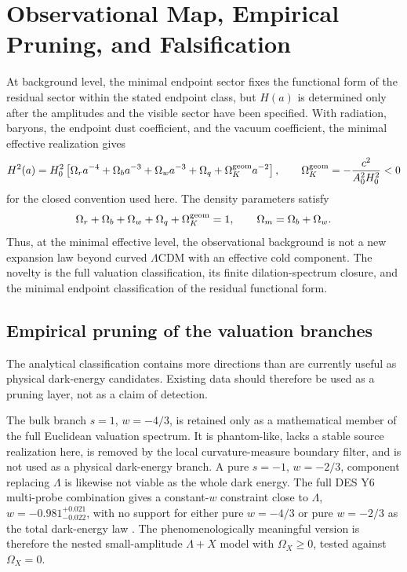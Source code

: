 \documentclass[11pt,a4paper]{article}
\numberwithin{equation}{section}
\theoremstyle{definition}
\theoremstyle{plain}
\theoremstyle{remark}
\begin{document}
\section{Observational Map, Empirical Pruning, and Falsification}
At background level, the minimal endpoint sector fixes the functional form of the residual sector within the stated endpoint class, but \(H(a)\) is determined only after the amplitudes and the visible sector have been specified. With radiation, baryons, the endpoint dust coefficient, and the vacuum coefficient, the minimal effective realization gives
\begin{equation}
H^2(a)=H_0^2\left[
\Omega_r a^{-4}
+\Omega_b a^{-3}
+\Omega_w a^{-3}
+\Omega_q
+\Omega_K^{\rm geom} a^{-2}
\right],
\qquad
\Omega_K^{\rm geom}=-\frac{c^2}{A_0^2H_0^2}<0
\end{equation}
for the closed convention used here. The density parameters satisfy
\begin{equation}
\Omega_r+\Omega_b+\Omega_w+\Omega_q+\Omega_K^{\rm geom}=1,
\qquad
\Omega_m=\Omega_b+\Omega_w.
\end{equation}
Thus, at the minimal effective level, the observational background is not a new expansion law beyond curved \(\Lambda\)CDM with an effective cold component. The novelty is the full valuation classification, its finite dilation-spectrum closure, and the minimal endpoint classification of the residual functional form.

\subsection{Empirical pruning of the valuation branches}
The analytical classification contains more directions than are currently useful as physical dark-energy candidates. Existing data should therefore be used as a pruning layer, not as a claim of detection.

The bulk branch \(s=1\), \(w=-4/3\), is retained only as a mathematical member of the full Euclidean valuation spectrum. It is phantom-like, lacks a stable source realization here, is removed by the local curvature-measure boundary filter, and is not used as a physical dark-energy branch. A pure \(s=-1\), \(w=-2/3\), component replacing \(\Lambda\) is likewise not viable as the whole dark energy. The full DES Y6 multi-probe combination gives a constant-\(w\) constraint close to \(\Lambda\), \(w=-0.981^{+0.021}_{-0.022}\), with no support for either pure \(w=-4/3\) or pure \(w=-2/3\) as the total dark-energy law \cite{DESY6ThreeByTwo2026}. The phenomenologically meaningful version is therefore the nested small-amplitude \(\Lambda+X\) model with \(\Omega_X\ge0\), tested against \(\Omega_X=0\).
\end{document}
